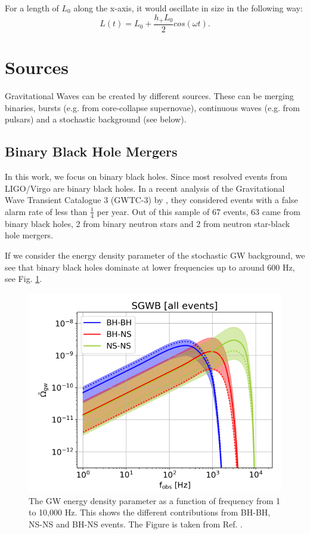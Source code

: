 For a length of $L_0$ along the x-axis, it would oscillate in size in the
following way:
\begin{equation}
    L(t) = L_0 + \frac{h_+ L_0}{2} cos(\omega t).
\end{equation}

\section{Sources}
Gravitational Waves can be created by different sources. These can be
merging binaries, bursts (e.g. from core-collapse supernovae), continuous waves 
(e.g. from pulsars) and a stochastic background (see below).

\subsection{Binary Black Hole Mergers}
In this work, we focus on binary black holes. Since most resolved events from LIGO/Virgo are binary black holes. In a recent analysis of the Gravitational Wave Transient Catalogue 3 (GWTC-3) by \cite{the_ligo_scientific_collaboration_population_2022}, they considered events with a false alarm rate of less than $\frac{1}{4}$ per year. Out of this sample of 67 events, 63 came from binary black holes, 2 from binary neutron stars and 2 from neutron star-black hole mergers.

If we consider the energy density parameter of the stochastic GW background, we see that binary black holes dominate at lower frequencies up to around 600 Hz, see Fig. \ref{BG_sources}.

\begin{figure}[h]
    \centering
    \includegraphics[width=0.7\linewidth]{Images/Capurri_GW_Background_monopole_sources.png}
    \caption{The GW energy density parameter as a function of frequency from 1 to 10,000 Hz. This shows the different contributions from BH-BH, NS-NS and BH-NS events. The Figure is taken from Ref. \cite{capurri_intensity_2021}.}
    \label{BG_sources}
\end{figure} 

